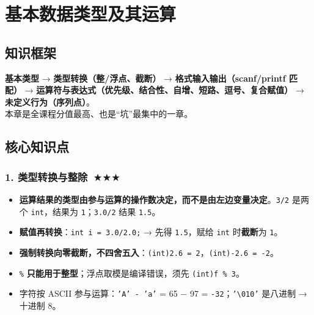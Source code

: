 \documentclass[UTF8,zihao=-4,a4paper]{ctexart}
\newcommand{\cstar}{\textcolor{deepred}{$\bigstar$}}
\begin{document}

\section{基本数据类型及其运算}

\subsection{知识框架}

\begin{keybox}[本章脉络]
\textbf{基本类型} → \textbf{类型转换（整/浮点、截断）} → \textbf{格式输入输出（scanf/printf 匹配）} → \textbf{运算符与表达式（优先级、结合性、自增、短路、逗号、复合赋值）} → \textbf{未定义行为（序列点）}。\\
本章是全课程分值最高、也是“坑”最集中的一章。
\end{keybox}

\subsection{核心知识点}

\subsubsection*{1. 类型转换与整除\ \cstar\cstar\cstar}
\begin{itemize}
  \item \textbf{运算结果的类型由参与运算的操作数决定，而不是由左边变量决定}。\texttt{3/2} 是两个 \texttt{int}，结果为 \texttt{1}；\texttt{3.0/2} 结果 \texttt{1.5}。
  \item \textbf{赋值再转换}：\texttt{int i = 3.0/2.0;} → 先得 \texttt{1.5}，赋给 \texttt{int} 时\textbf{截断}为 \texttt{1}。
  \item \textbf{强制转换向零截断，不四舍五入}：\texttt{(int)2.6 = 2}，\texttt{(int)-2.6 = -2}。
  \item \texttt{\%} \textbf{只能用于整型}；浮点取模是编译错误，须先 \texttt{(int)f \% 3}。
  \item 字符按 ASCII 参与运算：\texttt{'A' - 'a'} = 65 − 97 = \texttt{-32}；\texttt{'\textbackslash 010'} 是八进制 → 十进制 8。
\end{itemize}
\end{document}
